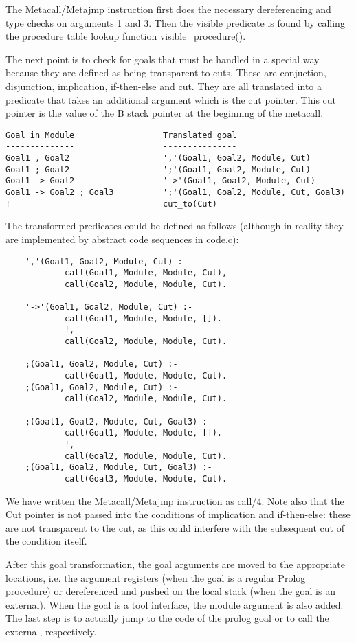 The Metacall/Metajmp instruction first does the necessary dereferencing
and type checks on arguments 1 and 3.
Then the visible predicate is found by calling
the procedure table lookup function visible_procedure().

The next point is to check for goals that must be handled in a special
way because they are defined as being transparent to cuts.
These are conjuction, disjunction, implication, if-then-else  and cut.
They are all translated into a predicate that takes an additional
argument which is the cut pointer. This cut pointer is the value of the
B stack pointer at the beginning of the metacall.
\begin{verbatim}
Goal in Module                  Translated goal
--------------                  ---------------
Goal1 , Goal2                   ','(Goal1, Goal2, Module, Cut)
Goal1 ; Goal2                   ';'(Goal1, Goal2, Module, Cut)
Goal1 -> Goal2                  '->'(Goal1, Goal2, Module, Cut)
Goal1 -> Goal2 ; Goal3          ';'(Goal1, Goal2, Module, Cut, Goal3)
!                               cut_to(Cut)
\end{verbatim}
The transformed predicates could be defined as follows (although
in reality they are implemented by abstract code sequences in code.c):
\begin{verbatim}
    ','(Goal1, Goal2, Module, Cut) :-
            call(Goal1, Module, Module, Cut),
            call(Goal2, Module, Module, Cut).

    '->'(Goal1, Goal2, Module, Cut) :-
            call(Goal1, Module, Module, []).
            !,
            call(Goal2, Module, Module, Cut).

    ;(Goal1, Goal2, Module, Cut) :-
            call(Goal1, Module, Module, Cut).
    ;(Goal1, Goal2, Module, Cut) :-
            call(Goal2, Module, Module, Cut).

    ;(Goal1, Goal2, Module, Cut, Goal3) :-
            call(Goal1, Module, Module, []).
            !,
            call(Goal2, Module, Module, Cut).
    ;(Goal1, Goal2, Module, Cut, Goal3) :-
            call(Goal3, Module, Module, Cut).
\end{verbatim}
We have written the Metacall/Metajmp instruction as call/4.
Note also that the Cut pointer is not passed into the conditions
of implication and if-then-else: these are not transparent to the
cut, as this could interfere with the subsequent cut of the condition
itself.

After this goal transformation, the goal arguments are moved to the
appropriate locations, i.e. the argument registers (when the goal is a
regular Prolog procedure) or dereferenced and pushed on the local
stack (when the goal is an external).  When the goal is a tool
interface, the module argument is also added.  The last step is to
actually jump to the code of the prolog goal or to call the external,
respectively.



